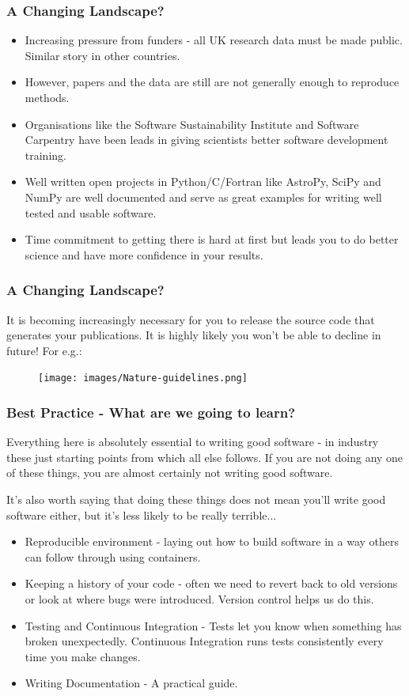 \documentclass{beamer}
\begin{document}
\begin{frame}
    \frametitle{A Changing Landscape?}
    \begin{itemize}
        \item Increasing pressure from funders - all UK research data must be made public. Similar story in other countries.
        \item However, papers and the data are still are not generally enough to reproduce methods.
        \item Organisations like the Software Sustainability Institute and Software Carpentry have been leads in giving scientists better software development training.
        \item Well written open projects in Python/C/Fortran like AstroPy, SciPy and NumPy are well documented and serve as great examples for writing well tested and usable software.
        \item Time commitment to getting there is hard at first but leads you to do better science and have more confidence in your results.

    \end{itemize}
\end{frame}

\begin{frame}
\frametitle{A Changing Landscape?}
    It is becoming increasingly necessary for you to release the source code that generates your publications. It is highly likely you won't be able to decline in future! For e.g.:
    \begin{figure}
        \texttt{[image: images/Nature-guidelines.png]}
    \end{figure}
    
\end{frame}
\begin{frame}
    \frametitle{Best Practice - What are we going to learn?}
    Everything here is absolutely essential to writing good software - in industry these just starting points from which all else follows.
    If you are not doing any one of these things, you are almost certainly not writing good software.

    It's also worth saying that doing these things does not mean you'll write good software either, but it's less likely to be really terrible...

    \begin{itemize}
        \item Reproducible environment - laying out how to build software in a way others can follow through using containers.
        \item Keeping a history of your code - often we need to revert back to old versions or look at where bugs were introduced. Version control helps us do this.
        \item Testing and Continuous Integration - Tests let you know when something has broken unexpectedly. Continuous Integration runs tests consistently every time you make changes.
        \item Writing Documentation - A practical guide.
    \end{itemize}
\end{frame}
\end{document}
